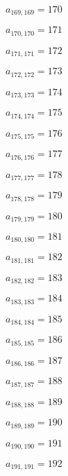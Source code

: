 \documentclass[a4paper,12pt]{article}
\begin{document}
$a _{ 169, 169 } = 170$

$a _{ 170, 170 } = 171$

$a _{ 171, 171 } = 172$

$a _{ 172, 172 } = 173$

$a _{ 173, 173 } = 174$

$a _{ 174, 174 } = 175$

$a _{ 175, 175 } = 176$

$a _{ 176, 176 } = 177$

$a _{ 177, 177 } = 178$

$a _{ 178, 178 } = 179$

$a _{ 179, 179 } = 180$

$a _{ 180, 180 } = 181$

$a _{ 181, 181 } = 182$

$a _{ 182, 182 } = 183$

$a _{ 183, 183 } = 184$

$a _{ 184, 184 } = 185$

$a _{ 185, 185 } = 186$

$a _{ 186, 186 } = 187$

$a _{ 187, 187 } = 188$

$a _{ 188, 188 } = 189$

$a _{ 189, 189 } = 190$

$a _{ 190, 190 } = 191$

$a _{ 191, 191 } = 192$
\end{document}
